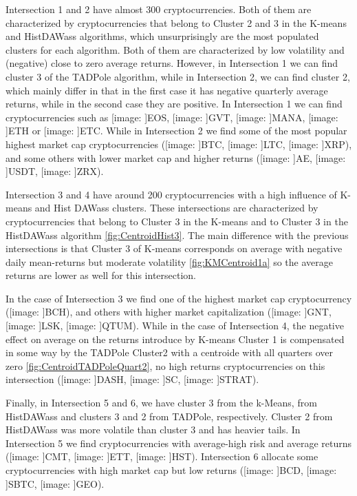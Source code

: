 \documentclass{bmcart}
\def\texttt{[image: ]}
\begin{document}
Intersection 1 and 2 have almost 300 cryptocurrencies.  Both of them are characterized by cryptocurrencies that belong to Cluster 2 and 3 in the K-means and HistDAWass algorithms, which unsurprisingly are the most populated clusters for each algorithm.  Both of them are characterized by low volatility and (negative) close to zero average returns. However, in Intersection 1 we can find cluster 3 of the TADPole algorithm, while in Intersection 2, we can find cluster 2, which mainly differ in that in the first case it has negative quarterly average returns, while in the second case they are positive. 
In Intersection 1 we can find cryptocurrencies such as \texttt{EOS}, \texttt{GVT}, \texttt{MANA}, \texttt{ETH} or \texttt{ETC}. While in Intersection 2 we find some of the most popular highest market cap cryptocurrencies (\texttt{BTC}, \texttt{LTC}, \texttt{XRP}), and some others with lower market cap and higher returns (\texttt{AE}, \texttt{USDT}, \texttt{ZRX}).  

Intersection 3 and 4 have around 200 cryptocurrencies with a high influence of K-means and Hist DAWass clusters. These intersections are characterized by cryptocurrencies that belong to Cluster 3 in the K-means and to Cluster 3 in the HistDAWass algorithm \ref{fig:CentroidHist3}. 
The main difference with the previous intersections is that Cluster 3 of K-means corresponds on average with negative daily mean-returns but moderate volatility \ref{fig:KMCentroid1a} so the average returns are lower as well for this intersection. 

In the case of Intersection 3 we find one of the highest market cap cryptocurrency (\texttt{BCH}), and others with higher market capitalization (\texttt{GNT}, \texttt{LSK}, \texttt{QTUM}). While in the case of Intersection 4, the negative effect on average on the returns introduce by K-means Cluster 1 is compensated in some way by the TADPole Cluster2 with a centroide with all quarters over zero \ref{fig:CentroidTADPoleQuart2}, no high returns cryptocurrencies on this intersection (\texttt{DASH}, \texttt{SC}, \texttt{STRAT}). 

Finally, in Intersection 5 and 6, we have cluster 3 from the k-Means,  from HistDAWass and clusters 3 and 2 from TADPole, respectively. Cluster 2 from HistDAWass was more volatile than cluster 3 and has heavier tails. In Intersection 5 we find cryptocurrencies with average-high risk and average returns (\texttt{CMT}, \texttt{ETT}, \texttt{HST}). Intersection 6 allocate some cryptocurrencies with high market cap  but low returns (\texttt{BCD}, \texttt{SBTC}, \texttt{GEO}).
\end{document}
